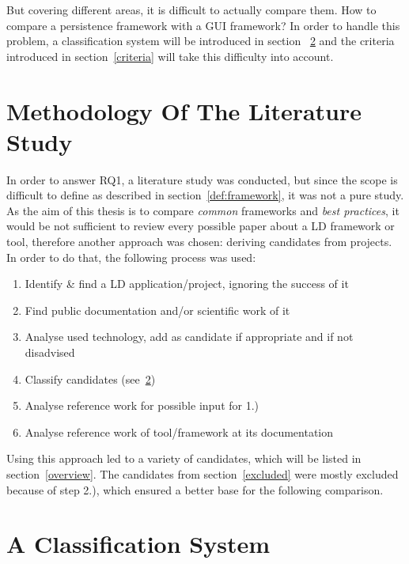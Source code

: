 But covering different areas, it is difficult to actually compare them. How to 
compare a persistence framework with a GUI framework? In order to handle this 
problem, a classification system will be introduced in section~
\ref{classification} and the criteria introduced in section~\ref{criteria} will 
take this difficulty into account.

\section{Methodology Of The Literature Study}\label{meth_study}
In order to answer RQ1, a literature study was conducted, but since the scope is 
difficult to define as described in section~\ref{def:framework}, it was not a pure 
study. As the aim of this thesis is to compare \textit{common} frameworks and 
\textit{best practices}, it would be not sufficient to review every possible paper 
about a LD framework or tool, therefore another approach was chosen: deriving 
candidates from projects. In order to do that, the following process was used:

\begin{enumerate}
\item Identify \& find a LD application/project, ignoring the success of it
\item Find public documentation and/or scientific work of it
\item Analyse used technology, add as candidate if appropriate and if not disadvised
\item Classify candidates (see~\ref{classification})
\item Analyse reference work for possible input for 1.)
\item Analyse reference work of tool/framework at its documentation
\end{enumerate}

Using this approach led to a variety of candidates, which will be listed in 
section~\ref{overview}. The candidates from section~\ref{excluded} were mostly 
excluded because of step 2.), which ensured a better base for the following 
comparison.

\section{A Classification System}\label{classification}

